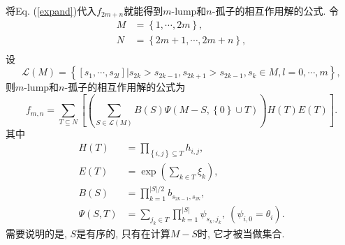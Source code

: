 \documentclass[12pt,a4paper,UTF8]{article}
\newcommand{\sbrace}[1]{\left(#1\right)}
\newcommand{\mbrace}[1]{\left[#1\right]}
\newcommand{\bbrace}[1]{\left\{#1\right\}}
\newcommand{\refeqn}[1]{Eq. (\ref{#1})}
\newcommand{\MLNS}{$m$-lump和$n$-孤子的相互作用解}
\begin{document}
将\refeqn{expand}代入$f_{2m+n}$就能得到\MLNS{}的公式. 令
\begin{equation}
\begin{aligned}
M&=\bbrace{1,\cdots,2m}, \\ 
N&=\bbrace{2m+1,\cdots,2m+n}, \\ 
\end{aligned}
\end{equation}
设
\begin{equation}
\mathcal{L}(M)=\bbrace{\mbrace{s_1,\cdots,s_{2l}}|s_{2k}>s_{2k-1},s_{2k+1}>s_{2k-1},s_k\in M,l=0,\cdots,m} , 
\end{equation}
则\MLNS{}的公式为
\begin{equation}
f_{m,n}=\sum_{T\subseteq N}\mbrace{
  \sbrace{
    \sum_{S\in \mathcal{L}(M)}{
      B(S)
      \Psi\sbrace{M-S,\bbrace{0}\cup T}
    }
  }
  H(T)
  E(T)
}. 
\label{fmn}
\end{equation}
其中 
\begin{equation}
\begin{aligned}
H(T)&=\prod_{\bbrace{i,j}\subseteq T}{h_{i,j}}, \\ 
E(T)&=\exp\sbrace{\sum_{k\in T}{\xi_k}}, \\ 
B(S)&=\prod_{k=1}^{|S|/2}{b_{s_{2k-1},s_{2k}}},\\ 
\Psi(S,T)&=\sum_{j_k\in T}{\prod_{k=1}^{|S|}{\psi_{s_k,j_k}}}, ~(\psi_{i,0}=\theta_i). 
\end{aligned}
\end{equation}
需要说明的是, $S$是有序的, 只有在计算$M-S$时, 它才被当做集合. 
\end{document}
